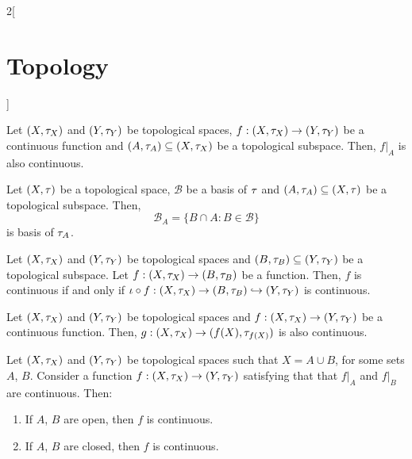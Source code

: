 \documentclass[../../../main.tex]{subfiles}
\begin{document}
\begin{multicols}{2}[\section{Topology}]
\begin{proposition}
  \end{proposition}
  \begin{corollary}
    Let $(X,\tau_X)$ and $(Y,\tau_Y)$ be topological spaces, $f:(X,\tau_X)\rightarrow (Y,\tau_Y)$ be a continuous function and $(A,\tau_A)\subseteq (X,\tau_X)$ be a topological subspace. Then, $f|_A$ is also continuous.
  \end{corollary}
  \begin{proposition}
    Let $(X,\tau)$ be a topological space, $\mathcal{B}$ be a basis of $\tau$ and $(A,\tau_A)\subseteq (X,\tau)$ be a topological subspace. Then, $$\mathcal{B}_A=\{B\cap A:B\in\mathcal{B}\}$$ is basis of $\tau_A$.
  \end{proposition}
  \begin{proposition}
    Let $(X,\tau_X)$ and $(Y,\tau_Y)$ be topological spaces and $(B,\tau_B)\subseteq (Y,\tau_Y)$ be a topological subspace. Let $f:(X,\tau_X)\rightarrow (B,\tau_B)$ be a function. Then, $f$ is continuous if and only if $\iota\circ f:(X,\tau_X)\rightarrow (B,\tau_B)\hookrightarrow (Y,\tau_Y)$ is continuous.
  \end{proposition}
  \begin{corollary}
    Let $(X,\tau_X)$ and $(Y,\tau_Y)$ be topological spaces and $f:(X,\tau_X)\rightarrow (Y,\tau_Y)$ be a continuous function. Then, $g:(X,\tau_X)\rightarrow (f(X),\tau_{f(X)})$ is also continuous.
  \end{corollary}
  \begin{proposition}
    Let $(X,\tau_X)$ and $(Y,\tau_Y)$ be topological spaces such that $X=A\cup B$, for some sets $A$, $B$. Consider a function $f:(X,\tau_X)\rightarrow (Y,\tau_Y)$ satisfying that that $f|_A$ and $f|_B$ are continuous. Then:
    \begin{enumerate}
      \item If $A$, $B$ are open, then $f$ is continuous.
      \item If $A$, $B$ are closed, then $f$ is continuous.
    \end{enumerate}
  \end{proposition}

\end{multicols}
\end{document}
